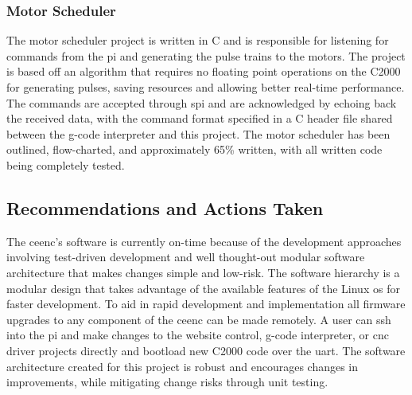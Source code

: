 \subsubsection{Motor Scheduler}
The motor scheduler project is written in C and is responsible for listening for commands from the \gls{pi} and generating the pulse trains to the motors.
The project is based off an algorithm that requires no floating point operations on the C2000 for generating pulses, saving resources and allowing better real-time performance.
The commands are accepted through \gls{spi} and are acknowledged by echoing back the received data, with the command format specified in a C header file shared between the g-code interpreter and this project.
The motor scheduler has been outlined, flow-charted, and approximately 65\% written, with all written code being completely tested.

\subsection{Recommendations and Actions Taken}
The \gls{ceenc}'s software is currently on-time because of the development approaches involving test-driven development and well thought-out modular software architecture that makes changes simple and low-risk.
The software hierarchy is a modular design that takes advantage of the available features of the Linux \gls{os} for faster development.
To aid in rapid development and implementation all firmware upgrades to any component of the \gls{ceenc} can be made remotely.
A user can \gls{ssh} into the \gls{pi} and make changes to the website control, g-code interpreter, or \gls{cnc} driver projects directly and bootload new C2000 code over the \gls{uart}.
The software architecture created for this project is robust and encourages changes in improvements, while mitigating change risks through unit testing.
